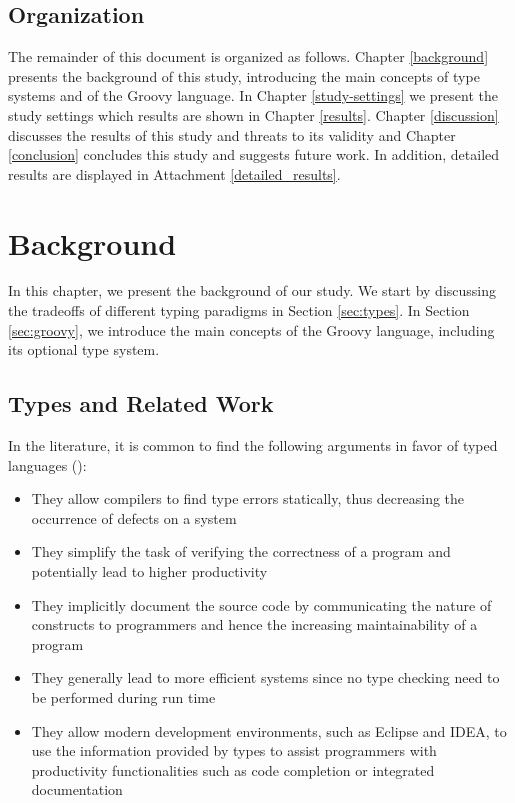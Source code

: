 \documentclass[msc]{ppgccufmg}
\begin{document}
\section{Organization}
The remainder of this document is organized as follows. 
Chapter \ref{background} presents the background of this study, introducing the main concepts of type systems and of the Groovy language.
In Chapter \ref{study-settings} we present the study settings which results are shown in Chapter \ref{results}.
Chapter \ref{discussion} discusses the results of this study and threats to its validity and Chapter \ref{conclusion} concludes this study and suggests future work.
In addition, detailed results are displayed in Attachment \ref{detailed_results}.











%
%
\chapter{Background\label{background}}
In this chapter, we present the background of our study.
We start by discussing the tradeoffs of different typing paradigms in Section \ref{sec:types}.
In Section \ref{sec:groovy}, we introduce the main concepts of the Groovy language, including its optional type system.

\section{Types and Related Work\label{sec:types}}
In the literature, it is common to find the following arguments in favor of typed languages (\cite{type_systems, should_your_specification_language_be_typed, mayer2012static, bruch2009learning}):

\begin{itemize}
	\item They allow compilers to find type errors statically, thus decreasing the occurrence of defects on a system
	\item They simplify the task of verifying the correctness of a program and potentially lead to higher productivity
	\item They implicitly document the source code by communicating the nature of constructs to programmers and hence the increasing maintainability of a program
	\item They generally lead to more efficient systems since no type checking need to be performed during run time
	\item They allow modern development environments, such as Eclipse and IDEA, to use the information provided by types to assist programmers with productivity functionalities such as code completion or integrated documentation
\end{itemize}
\end{document}
